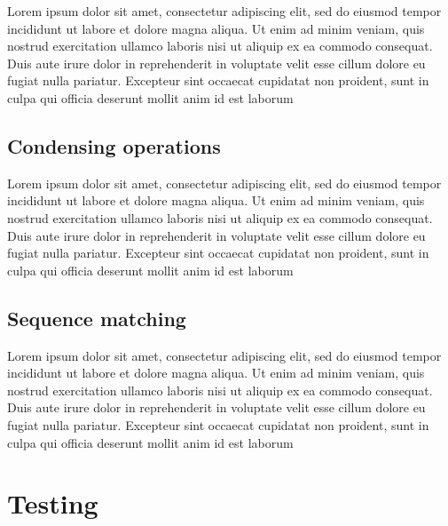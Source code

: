 \par Lorem ipsum dolor sit amet, consectetur adipiscing elit, sed do eiusmod tempor incididunt ut labore et dolore magna aliqua. Ut enim ad minim veniam, quis nostrud exercitation ullamco laboris nisi ut aliquip ex ea commodo consequat. Duis aute irure dolor in reprehenderit in voluptate velit esse cillum dolore eu fugiat nulla pariatur. Excepteur sint occaecat cupidatat non proident, sunt in culpa qui officia deserunt mollit anim id est laborum

\subsection{Condensing operations}
\label{subsec:ch2sec3sec2}

\par Lorem ipsum dolor sit amet, consectetur adipiscing elit, sed do eiusmod tempor incididunt ut labore et dolore magna aliqua. Ut enim ad minim veniam, quis nostrud exercitation ullamco laboris nisi ut aliquip ex ea commodo consequat. Duis aute irure dolor in reprehenderit in voluptate velit esse cillum dolore eu fugiat nulla pariatur. Excepteur sint occaecat cupidatat non proident, sunt in culpa qui officia deserunt mollit anim id est laborum

\subsection{Sequence matching}
\label{subsec:ch2sec3sec3}

\par Lorem ipsum dolor sit amet, consectetur adipiscing elit, sed do eiusmod tempor incididunt ut labore et dolore magna aliqua. Ut enim ad minim veniam, quis nostrud exercitation ullamco laboris nisi ut aliquip ex ea commodo consequat. Duis aute irure dolor in reprehenderit in voluptate velit esse cillum dolore eu fugiat nulla pariatur. Excepteur sint occaecat cupidatat non proident, sunt in culpa qui officia deserunt mollit anim id est laborum

\section{Testing}
\label{sec:ch2sec4}